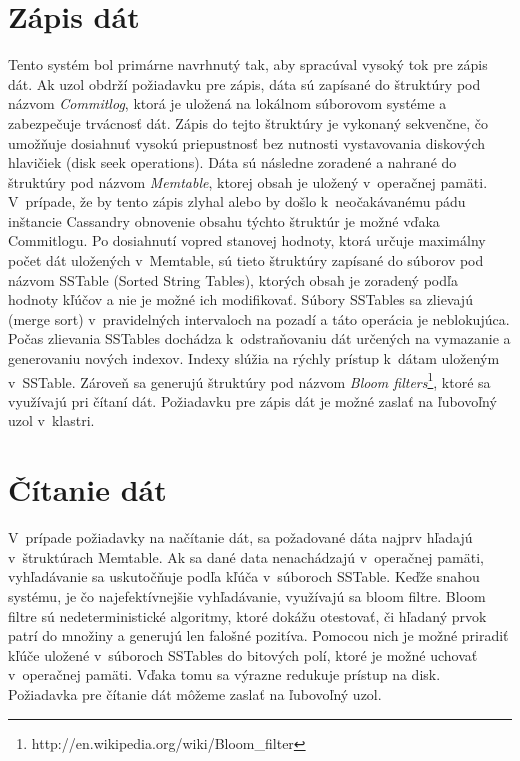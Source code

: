 \documentclass[11pt,twoside,a4paper]{book}
\begin{document}
\section{Zápis dát}
Tento systém bol primárne navrhnutý tak, aby spracúval vysoký tok pre zápis dát. Ak uzol obdrží požiadavku pre zápis, dáta sú zapísané do štruktúry pod názvom \emph{Commitlog}, ktorá je uložená na lokálnom súborovom systéme a zabezpečuje trvácnosť dát. Zápis do tejto štruktúry je vykonaný sekvenčne, čo umožňuje dosiahnuť vysokú priepustnosť bez nutnosti vystavovania diskových hlavičiek (disk seek operations). Dáta sú následne zoradené a nahrané do štruktúry pod názvom \emph{Memtable}, ktorej obsah je uložený v~operačnej pamäti. V~prípade, že by tento zápis zlyhal alebo by došlo k~neočakávanému pádu inštancie Cassandry obnovenie obsahu týchto štruktúr je možné vďaka Commitlogu. Po dosiahnutí vopred stanovej hodnoty, ktorá určuje maximálny počet dát uložených v~Memtable, sú tieto štruktúry zapísané do súborov pod názvom SSTable (Sorted String Tables), ktorých obsah je zoradený podľa hodnoty kľúčov a nie je možné ich modifikovať. Súbory SSTables sa zlievajú (merge sort) v~pravidelných intervaloch na pozadí a táto operácia je neblokujúca. Počas zlievania SSTables dochádza k~odstraňovaniu dát určených na vymazanie a generovaniu nových indexov. Indexy slúžia na rýchly prístup k~dátam uloženým v~SSTable. Zároveň sa generujú štruktúry pod názvom \emph{Bloom filters}\footnote{http://en.wikipedia.org/wiki/Bloom\_filter}, ktoré sa využívajú pri čítaní dát. Požiadavku pre zápis dát je možné zaslať na ľubovoľný uzol v~klastri.


\section{Čítanie dát}
V~prípade požiadavky na načítanie dát, sa požadované dáta najprv hľadajú v~štruktúrach Memtable. Ak sa dané data nenachádzajú v~operačnej pamäti, vyhľadávanie sa uskutočňuje podľa kľúča v~súboroch SSTable. Keďže snahou systému, je čo najefektívnejšie vyhľadávanie, využívajú sa bloom filtre. Bloom filtre sú nedeterministické algoritmy, ktoré dokážu otestovať, či hľadaný prvok patrí do množiny a generujú len falošné pozitíva. Pomocou nich je možné priradiť kľúče uložené v~súboroch SSTables do bitových polí, ktoré je možné uchovať v~operačnej pamäti. Vďaka tomu sa výrazne redukuje prístup na disk. Požiadavka pre čítanie dát môžeme zaslať na ľubovoľný uzol.
\end{document}
